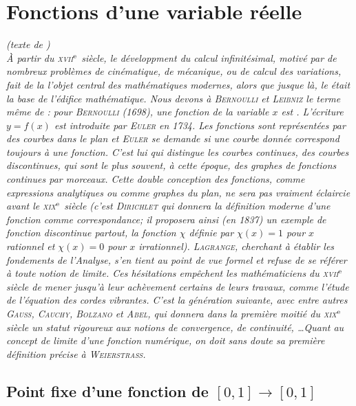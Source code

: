 \chapter{Fonctions d'une variable réelle}

\textsl{
(texte de \cite{oraux_x_ens_3})\\
À partir du \textsc{xvii}$^{\mathrm{e}}$ siècle, le développment du calcul infinitésimal, motivé par de nombreux problèmes de cinématique, de mécanique, ou de calcul des variations, fait de la  l'objet central des mathématiques modernes, alors que jusque là, le  était la base de l'édifice mathématique. Nous devons à \textsc{Bernoulli} et \textsc{Leibniz} le terme même de : pour \textsc{Bernoulli} (1698), une fonction de la variable $x$ est . L'écriture $y = f(x)$ est introduite par \textsc{Euler} en 1734. Les fonctions sont représentées par des courbes dans le plan et \textsc{Euler} se demande si une courbe donnée correspond toujours à une fonction. C'est lui qui distingue les courbes continues, des courbes discontinues, qui sont le plus souvent, à cette époque, des graphes de fonctions continues par morceaux. Cette double conception des fonctions, comme expressions analytiques ou comme graphes du plan, ne sera pas vraiment éclaircie avant le \textsc{xix}$^{\mathrm{e}}$ siècle (c'est \textsc{Dirichlet} qui donnera la définition moderne d'une fonction comme correspondance; il proposera ainsi (en 1837) un exemple de fonction discontinue partout, la fonction $\chi$ définie par $\chi(x) = 1$ pour $x$ rationnel et $\chi(x)=0$ pour $x$ irrationnel). \textsc{Lagrange}, cherchant à établir les fondements de l'Analyse, s'en tient au point de vue formel et refuse de se référer à toute notion de limite. Ces hésitations empêchent les mathématiciens du \textsc{xvii}$^{\mathrm{e}}$ siècle  de mener jusqu'à leur achèvement certains de leurs travaux, comme l'étude de l'équation des cordes vibrantes. C'est la génération suivante, avec entre autres \textsc{Gauss}, \textsc{Cauchy}, \textsc{Bolzano} et \textsc{Abel}, qui donnera dans la première moitié du \textsc{xix}$^{\mathrm{e}}$ siècle un statut rigoureux aux notions de convergence, de continuité, \dots Quant au concept de limite d'une fonction numérique, on doit sans doute sa première définition précise à \textsc{Weierstrass}. 
}


\newpage

\section{Point fixe d'une fonction de \texorpdfstring{$[0, 1] \rightarrow [0, 1]$}{[0, 1] dans [0, 1]}}



